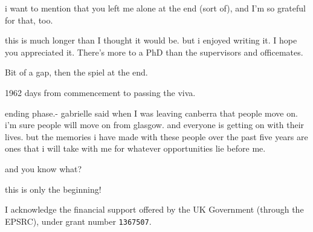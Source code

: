 \begin{preamble}
i want to mention that you left me alone at the end (sort of), and I'm so grateful for that, too.

\acksep

this is much longer than I thought it would be.
but i enjoyed writing it. I hope you appreciated it.
There's more to a PhD than the supervisors and officemates.


Bit of a gap, then the spiel at the end.

1962 days from commencement to passing the viva.

ending phase.- gabrielle said when I was leaving canberra that people move on.
i'm sure people will move on from glasgow. and everyone is getting on with their lives.
but the memories i have made with these people over the past five years are ones that i will take with me for whatever opportunities lie before me.

and you know what?

this is only the beginning!

I acknowledge the financial support offered by the UK Government (through the EPSRC), under grant number \texttt{1367507}.

\end{preamble}